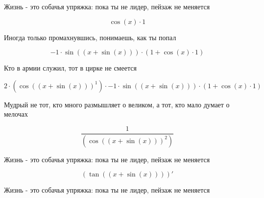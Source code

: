\documentclass[a4paper,12pt]{article}
\begin{document}
\begin{center}
Жизнь - это собачья упряжка: пока ты не лидер, пейзаж не меняется
\end{center}

\begin{center}
\begin{equation}
\cos(x) \cdot 1
\end{equation}
\end{center}

\begin{center}
Иногда только промахнувшись, понимаешь, как ты попал
\end{center}

\begin{center}
\begin{equation}
-1 \cdot \sin((x + \sin(x))) \cdot (1 + \cos(x) \cdot 1)
\end{equation}
\end{center}

\begin{center}
Кто в армии служил, тот в цирке не смеется
\end{center}

\begin{center}
\begin{equation}
2 \cdot (\cos((x + \sin(x)))^{1}) \cdot -1 \cdot \sin((x + \sin(x))) \cdot (1 + \cos(x) \cdot 1)
\end{equation}
\end{center}

\begin{center}
Мудрый не тот, кто много размышляет о великом, а тот, кто мало думает о мелочах
\end{center}

\begin{center}
\begin{equation}
 \frac{1 }{ (\cos((x + \sin(x)))^{2}) } 
\end{equation}
\end{center}

\begin{center}
Жизнь - это собачья упряжка: пока ты не лидер, пейзаж не меняется
\end{center}

\begin{center}
\begin{equation}
(\tan((x + \sin(x))))'
\end{equation}
\end{center}

\begin{center}
Жизнь - это собачья упряжка: пока ты не лидер, пейзаж не меняется
\end{center}
\end{document}
